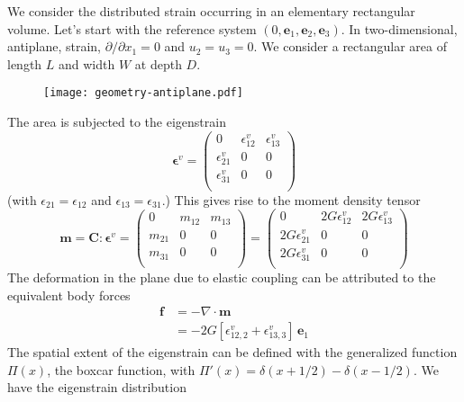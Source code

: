 \documentclass[letterpaper,12pt,]{memoir}
\begin{document}
We consider the distributed strain occurring in an elementary rectangular volume. Let's start with the reference system $(0,\textbf{e}_1,\textbf{e}_2,\textbf{e}_3)$. In two-dimensional, antiplane, strain, $\partial/\partial x_1=0$ and $u_2=u_3=0$. We consider a rectangular area of length $L$ and width $W$ at depth $D$. 
%
\begin{figure}[h]
\centering
\texttt{[image: geometry-antiplane.pdf]}
\end{figure}
% 


The area is subjected to the eigenstrain
\begin{equation}
\boldsymbol{\epsilon}^v=\left(\begin{matrix}
0 & \epsilon_{12}^v & \epsilon_{13}^v\\
\epsilon_{21}^v & 0 & 0\\
\epsilon_{31}^v & 0 & 0\\
\end{matrix}\right)
\end{equation}
(with $\epsilon_{21}=\epsilon_{12}$ and $\epsilon_{13}=\epsilon_{31}$.) This gives rise to the moment density tensor
\begin{equation}
\textbf{m}=\textbf{C}: \boldsymbol{\epsilon}^v=\left(\begin{matrix}
0 & m_{12} & m_{13}\\
m_{21} & 0 & 0\\
m_{31} & 0 & 0\\
\end{matrix}\right)=\left(\begin{matrix}
0 & 2G\epsilon_{12}^v & 2G\epsilon_{13}^v\\
2G\epsilon_{21}^v & 0 & 0\\
2G\epsilon_{31}^v & 0 & 0\\
\end{matrix}\right)
\end{equation} 
The deformation in the plane due to elastic coupling can be attributed to the equivalent body forces
\begin{equation}
\begin{aligned}
\textbf{f}&=-\nabla\cdot\textbf{m}\\
&=-2G\left[\epsilon_{12,2}^v+\epsilon_{13,3}^v\right]\,\textbf{e}_1
\end{aligned}
\end{equation}
The spatial extent of the eigenstrain can be defined with the generalized function $\Pi(x)$, the boxcar function, with $\Pi'(x)=\delta(x+1/2)-\delta(x-1/2)$. We have the eigenstrain distribution\\
\end{document}
